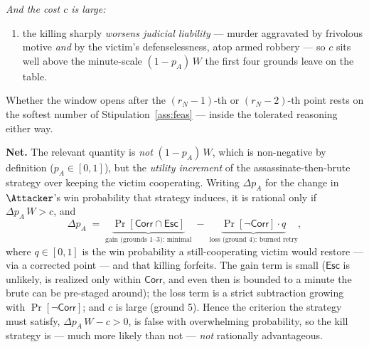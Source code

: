 \noindent\emph{And the cost $c$ is large:}
\begin{enumerate}[nosep,leftmargin=1.6em,start=5]
  \item the killing sharply \emph{worsens judicial liability} --- murder
        aggravated by frivolous motive \emph{and} by the victim's defenselessness,
        atop armed robbery --- so $c$ sits well above the minute-scale
        $(1 - p_A)\,W$ the first four grounds leave on the table.
\end{enumerate}

Whether the window opens after the $(r_N{-}1)$-th or $(r_N{-}2)$-th point rests
on the softest number of Stipulation~\ref{ass:feas} --- inside the tolerated
reasoning either way.

\medskip
\noindent\textbf{Net.} The relevant quantity is \emph{not} $(1 - p_A)\,W$, which
is non-negative by definition ($p_A \in [0,1]$), but the \emph{utility increment}
of the assassinate-then-brute strategy over keeping the victim cooperating.
Writing $\Delta p_A$ for the change in $\Attacker$'s win probability that strategy
induces, it is rational only if $\Delta p_A\,W > c$, and
\[
  \Delta p_A \;=\;
  \underbrace{\Pr[\mathsf{Corr}\cap\mathsf{Esc}]}_{\text{gain (grounds 1--3): minimal}}
  \;-\;
  \underbrace{\Pr[\neg\mathsf{Corr}]\cdot q}_{\text{loss (ground 4): burned retry}},
\]
where $q \in [0,1]$ is the win probability a still-cooperating victim would
restore --- via a corrected point --- and that killing forfeits. The gain term is
small ($\mathsf{Esc}$ is unlikely, is realized only within $\mathsf{Corr}$, and
even then is bounded to a minute the brute can be pre-staged around); the loss
term is a strict subtraction growing with $\Pr[\neg\mathsf{Corr}]$; and $c$ is
large (ground 5). Hence the criterion the strategy must satisfy,
$\Delta p_A\,W - c > 0$, is false with overwhelming probability, so the kill
strategy is --- much more likely than not --- \emph{not} rationally advantageous.

